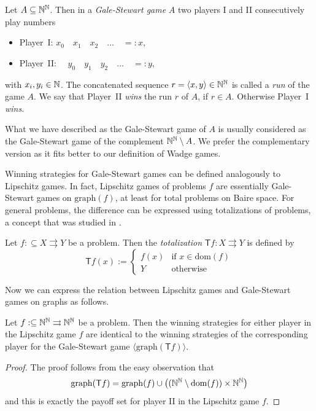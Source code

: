 \documentclass{amsart}
\def\IN{{\Bbb{N}}}
\def\In{\subseteq}
\def\mto{\rightrightarrows}
\def\T{{\mathsf{{T}}}}
\def\dom{{\mathrm{dom}}}
\def\graph{{\mathrm{graph}}}
\begin{document}
\begin{definition}
Let $A\In\IN^\IN$. Then in a {\em Gale-Stewart game} $A$
two players I and II consecutively play numbers
\begin{itemize}
\item Player~I: $x_0\quad  x_1\quad x_2 \quad...\quad=:x$,
\item Player~II: $\quad y_0\quad  y_1\quad y_2 \quad...\quad=:y$,
\end{itemize}
with $x_i,y_i\in\IN$. 
The concatenated sequence $r=\langle x,y\rangle\in\IN^\IN$ is called a {\em run} of the game $A$.
We say that Player~II {\em wins} the run $r$ of $A$, if
$r\in A$. Otherwise Player~I {\em wins}. 
\end{definition}

What we have described as the Gale-Stewart game of $A$ is usually considered as the Gale-Stewart game of the complement $\IN^\IN\setminus A$.
We prefer the complementary version as it fits better to our definition of
Wadge games.

Winning strategies for Gale-Stewart games can be defined analogously to Lipschitz games. 
In fact, Lipschitz games of problems $f$ are essentially Gale-Stewart games on $\graph(f)$,
at least for total problems on Baire space. For general problems, the difference can be expressed using
totalizations of problems, a concept that was studied in \cite{NP18,BG21a}.

\begin{definition}[Totalization]
Let $f:\In X\mto Y$ be a problem. Then the {\em totalization} $\T f:X\mto Y$ is defined by
\[\T f(x):=\left\{\begin{array}{ll}
f(x) & \mbox{if $x\in\dom(f)$}\\
Y & \mbox{otherwise}
\end{array}\right.\]
\end{definition}

Now we can express the relation between Lipschitz games and Gale-Stewart games on graphs
as follows.

\begin{proposition}
\label{prop:Lipschitz-Gale-Stewart}
Let $f:\In \IN^\IN\mto\IN^\IN$ be a problem. Then the winning strategies for either player in the Lipschitz game $f$ are identical to the winning strategies 
of the corresponding player for the Gale-Stewart game $\langle\graph(\T f)\rangle$.
\end{proposition}
\begin{proof}
The proof follows from the easy observation that 
\[\graph(\T f)=\graph(f)\cup\left((\IN^\IN\setminus\dom(f))\times\IN^\IN\right)\]
and this is exactly the payoff set for player II in the Lipschitz game $f$.
\end{proof}
\end{document}
